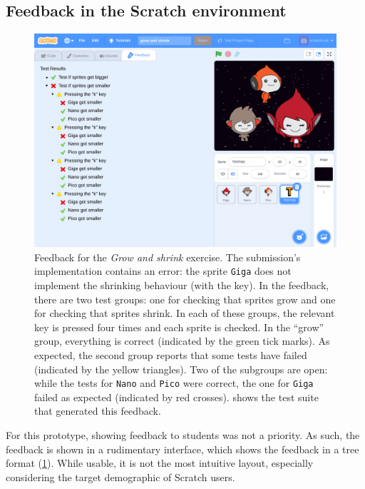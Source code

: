 \documentclass[../main]{subfiles}
\begin{document}
\subsection{Feedback in the Scratch environment}\label{subsec:feedback-in-the-scratch-environment}

\begin{figure}
    \begin{wide}
        \includegraphics[width=\linewidth]{scratch-poke-feedback}
    \end{wide}
    \caption{
        Feedback for the \emph{Grow and shrink} exercise.
        The submission's implementation contains an error: the sprite \texttt{Giga} does not implement the shrinking behaviour (with the  key).
        In the feedback, there are two test groups: one for checking that sprites grow and one for checking that sprites shrink.
        In each of these groups, the relevant key is pressed four times and each sprite is checked.
        In the ``grow'' group, everything is correct (indicated by the green tick marks).
        As expected, the second group reports that some tests have failed (indicated by the yellow triangles).
        Two of the subgroups are open: while the tests for \texttt{Nano} and \texttt{Pico} were correct, the one for \texttt{Giga} failed as expected (indicated by red crosses).
         shows the test suite that generated this feedback.
    }
    \label{fig:poke-feedback-result}
\end{figure}

For this prototype, showing feedback to students was not a priority.
As such, the feedback is shown in a rudimentary interface, which shows the feedback in a tree format (\cref{fig:poke-feedback-result}).
While usable, it is not the most intuitive layout, especially considering the target demographic of Scratch users.
\end{document}

